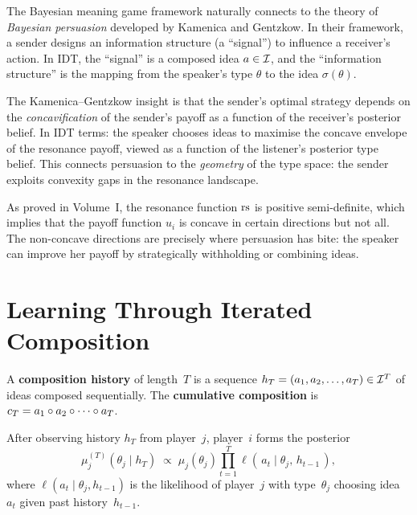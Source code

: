 \begin{interpretation}
The Bayesian meaning game framework naturally connects to the
theory of \emph{Bayesian persuasion} developed by Kamenica and
Gentzkow.  In their framework, a sender
designs an information structure (a ``signal'') to influence a
receiver's action.  In IDT, the ``signal'' is a composed idea
$a \in \mathcal{I}$, and the ``information structure'' is the mapping from
the speaker's type $\theta$ to the idea $\sigma(\theta)$.

The Kamenica--Gentzkow insight is that the sender's optimal strategy
depends on the \emph{concavification} of the sender's payoff as a
function of the receiver's posterior belief.  In IDT terms: the speaker
chooses ideas to maximise the concave envelope of the resonance
payoff, viewed as a function of the listener's posterior type belief.
This connects persuasion to the \emph{geometry} of the type space:
the sender exploits convexity gaps in the resonance landscape.

As proved in Volume~I, the resonance function $\mathrm{rs}$ is positive
semi-definite, which implies that the payoff function $u_i$ is
concave in certain directions but not all.  The non-concave directions
are precisely where persuasion has bite: the speaker can improve her
payoff by strategically withholding or combining ideas.
\end{interpretation}

\section{Learning Through Iterated Composition}
\label{sec:learning}

\begin{definition}
\label{def:composition-history}
A \textbf{composition history} of length~$T$ is a sequence
$h_T = (a_1, a_2, \ldots, a_T) \in \mathcal{I}^T$ of ideas composed
sequentially.  The \textbf{cumulative composition} is
$c_T = a_1 \circ a_2 \circ \cdots \circ a_T$.
\end{definition}

\begin{definition}
\label{def:posterior}
After observing history $h_T$ from player~$j$, player~$i$ forms
the posterior
\[
  \mu_j^{(T)}(\theta_j \mid h_T)
  \;\propto\;
  \mu_j(\theta_j)
  \prod_{t=1}^{T}
  \ell(\,a_t \mid \theta_j,\, h_{t-1}\,),
\]
where $\ell(a_t \mid \theta_j, h_{t-1})$ is the likelihood of
player~$j$ with type~$\theta_j$ choosing idea~$a_t$ given
past history~$h_{t-1}$.
\end{definition}

